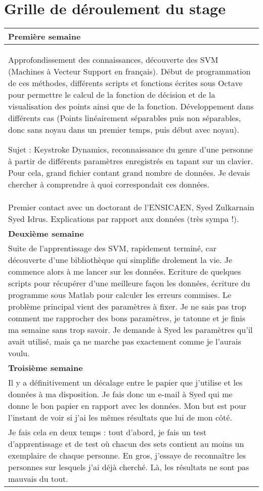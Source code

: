 \appendix
\section{Grille de déroulement du stage}
\begin{longtable}{|p{\textwidth}|}
\hline
\textbf{Première semaine}\\
\hline
Approfondissement des connaissances, découverte des SVM (Machines à Vecteur Support en français). Début de programmation de ces méthodes, différents scripts et fonctions écrites sous Octave pour permettre le calcul de la fonction de décision et de la visualisation des points ainsi que de la fonction. Développement dans différents cas (Points linéairement séparables puis non séparables, donc sans noyau dans un premier temps, puis début avec noyau).

Sujet : Keystroke Dynamics, reconnaissance du genre d'une personne à partir de différents paramètres enregistrés en tapant sur un clavier. Pour cela, grand fichier contant grand nombre de données. Je devais chercher à comprendre à quoi correspondait ces données. \\
Premier contact avec un doctorant de l'ENSICAEN, Syed Zulkarnain Syed Idrus. Explications par rapport aux données (très sympa !).
\\
\hline
\textbf{Deuxième semaine}\\
\hline
Suite de l'apprentissage des SVM, rapidement terminé, car découverte d'une bibliothèque qui simplifie drolement la vie. Je commence alors à me lancer sur les données. Ecriture de quelques scripts pour récupérer d'une meilleure façon les données, écriture du programme sous Matlab pour calculer les erreurs commises. Le problème principal vient des paramètres à fixer. Je ne sais pas trop comment me rapprocher des bons paramètres, je tatonne et je finis ma semaine sans trop savoir. Je demande à Syed les paramètres qu'il avait utilisé, mais ça ne marche pas exactement comme je l'aurais voulu.\\
\hline
\textbf{Troisième semaine}\\
\hline
Il y a définitivement un décalage entre le papier que j'utilise et les données à ma disposition. Je fais donc un e-mail à Syed qui me donne le bon papier en rapport avec les données. Mon but est pour l'instant de voir si j'ai les mêmes résultats que lui de mon côté.\\
Je fais cela en deux temps : tout d'abord, je fais un test d'apprentissage et de test où chacun des sets contient au moins un exemplaire de chaque personne. En gros, j'essaye de reconnaître les personnes sur lesquels j'ai déjà cherché. Là, les résultats ne sont pas mauvais du tout.\\

\end{longtable}

